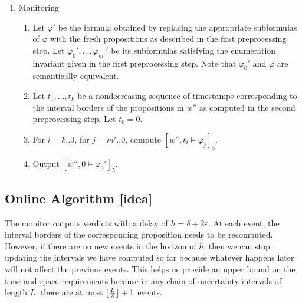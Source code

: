 \documentclass[envcountsame, runningheads]{llncs}
\newcommand{\rednote}[2][]{{\todo[color=magenta!80,size=\footnotesize,#1]{\normalcolor\normalfont#2}}}
\newcommand{\LTLo}{\ensuremath{\bigcirc}}
\let\LTLnext\LTLo
\def\until{\,\mathcal{U}\,}
\newcommand{\?}{\text{?}}
\DeclarePairedDelimiter\floor{\lfloor}{\rfloor}
\begin{document}
\begin{enumerate}
		\item Monitoring
		\begin{enumerate}[label=\arabic*.]
			\item Let $\varphi'$ be the formula obtained by replacing the appropriate subformulas of $\varphi$ with the fresh propositions as described in the first preprocessing step. Let $\varphi_0', \ldots, \varphi_{m'}'$ be its subformulas satisfying the enumeration invariant given in the first preprocessing step. Note that $\varphi_0'$  and $\varphi$ are semantically equivalent. %
			\item Let $t_1, \ldots, t_k$ be a nondecreasing sequence of timestamps corresponding to the interval borders of the propositions in $w''$ as computed in the second preprocessing step. Let $t_0 = 0$.
			\item For $i = k .. 0$, for $j = m' .. 0$, compute $[w'', t_i \models \varphi_j]_5$.
			\item Output $[w'',0 \models \varphi_0']_5$.
		\end{enumerate}
	\end{enumerate}
	
	

	
	\subsection*{Online Algorithm [idea]}
	The monitor outputs verdicts with a delay of $h = \delta + 2\varepsilon$.
	At each event, the interval borders of the corresponding proposition needs to be recomputed.
	However, if there are no new events in the horizon of $h$, then we can stop updating the intervals we have computed so far because whatever happens later will not affect the previous events.
	This helps us provide an upper bound on the time and space requirements because in any chain of uncertainty intervals of length $L$, there are at most $\floor{\frac{L}{\delta}} + 1$ events. \rednote{TODO: Clarify this.}
		
	\newpage
	
	
\end{document}
